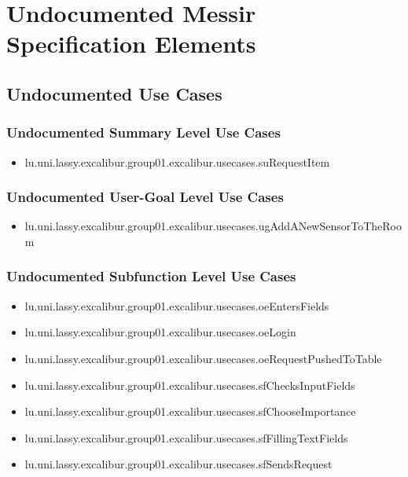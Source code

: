 	
\chapter{Undocumented Messir Specification Elements}


\section[Undocumented Use Cases]{Undocumented Use Cases}

\subsection[Undocumented Use Cases - Summary Level]{Undocumented Summary Level Use Cases}
\begin{itemize}
\item lu.uni.lassy.excalibur.group01.excalibur.usecases.suRequestItem 
\end{itemize}

\subsection[Undocumented Use Cases - User-Goal Level]{Undocumented User-Goal Level Use Cases}
\begin{itemize}
\item lu.uni.lassy.excalibur.group01.excalibur.usecases.ugAddANewSensorToTheRoom 
\end{itemize}

\subsection[Undocumented Use Cases - Subfunction Level]{Undocumented Subfunction Level Use Cases}
\begin{itemize}
\item lu.uni.lassy.excalibur.group01.excalibur.usecases.oeEntersFields 
\item lu.uni.lassy.excalibur.group01.excalibur.usecases.oeLogin 
\item lu.uni.lassy.excalibur.group01.excalibur.usecases.oeRequestPushedToTable 
\item lu.uni.lassy.excalibur.group01.excalibur.usecases.sfChecksInputFields 
\item lu.uni.lassy.excalibur.group01.excalibur.usecases.sfChooseImportance 
\item lu.uni.lassy.excalibur.group01.excalibur.usecases.sfFillingTextFields 
\item lu.uni.lassy.excalibur.group01.excalibur.usecases.sfSendsRequest 
\end{itemize}

